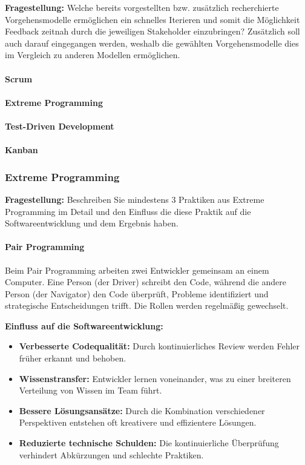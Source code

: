 \textbf{Fragestellung:} Welche bereits vorgestellten bzw. zusätzlich recherchierte Vorgehensmodelle ermöglichen ein
schnelles Iterieren und somit die Möglichkeit Feedback zeitnah durch die jeweiligen Stakeholder
einzubringen? Zusätzlich soll auch darauf eingegangen werden, weshalb die gewählten
Vorgehensmodelle dies im Vergleich zu anderen Modellen ermöglichen.
\\

\paragraph{Scrum}



\paragraph{Extreme Programming}


\paragraph{Test-Driven Development}


\paragraph{Kanban}



\subsubsection{Extreme Programming}

\textbf{Fragestellung:} Beschreiben Sie mindestens 3 Praktiken aus Extreme Programming im Detail und den Einfluss
die diese Praktik auf die Softwareentwicklung und dem Ergebnis haben.

\paragraph{Pair Programming}
Beim Pair Programming arbeiten zwei Entwickler gemeinsam an einem Computer. Eine Person (der Driver) schreibt den Code, 
während die andere Person (der Navigator) den Code überprüft, Probleme identifiziert und strategische Entscheidungen trifft. 
Die Rollen werden regelmäßig gewechselt.

\textbf{Einfluss auf die Softwareentwicklung:}
\begin{itemize}
    \item \textbf{Verbesserte Codequalität:} Durch kontinuierliches Review werden Fehler früher erkannt und behoben.
    \item \textbf{Wissenstransfer:} Entwickler lernen voneinander, was zu einer breiteren Verteilung von Wissen im Team führt.
    \item \textbf{Bessere Lösungsansätze:} Durch die Kombination verschiedener Perspektiven entstehen oft kreativere und effizientere Lösungen.
    \item \textbf{Reduzierte technische Schulden:} Die kontinuierliche Überprüfung verhindert Abkürzungen und schlechte Praktiken.
\end{itemize}

